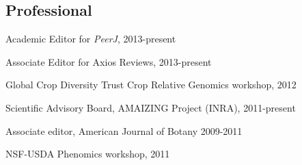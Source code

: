 \documentclass[letterpaper]{article}
\renewenvironment{itemize}{
  \begin{list}{}{
    \setlength{\leftmargin}{1.5em}
  }
}{
  \end{list}
}
\begin{document}
\begin{itemize}
\subsection*{Professional}
\item Academic Editor for \emph{PeerJ}, 2013-present
\item Associate Editor for Axios Reviews, 2013-present
\item Global Crop Diversity Trust Crop Relative Genomics workshop, 2012
\item Scientific Advisory Board, AMAIZING Project (INRA), 2011-present 
\item Associate editor, American Journal of Botany 2009-2011
\item NSF-USDA Phenomics workshop, 2011

\end{itemize}
\end{document}
